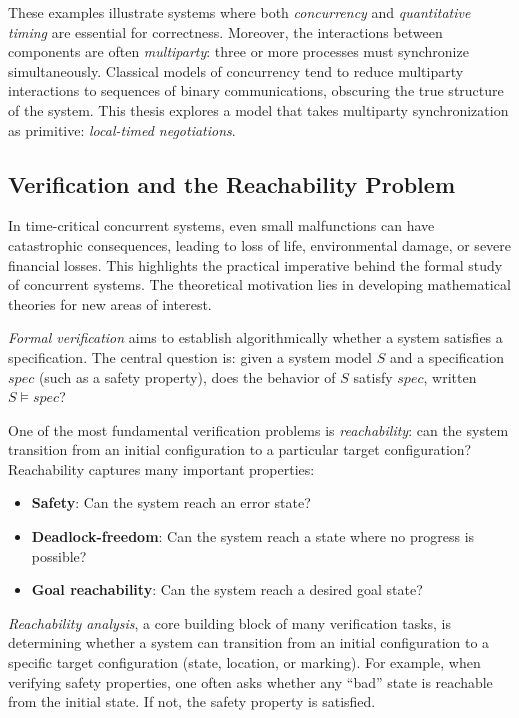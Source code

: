 These examples illustrate systems where both \emph{concurrency} and \emph{quantitative timing} are essential for correctness. Moreover, the interactions between components are often \emph{multiparty}: three or more processes must synchronize simultaneously. Classical models of concurrency tend to reduce multiparty interactions to sequences of binary communications, obscuring the true structure of the system. This thesis explores a model that takes multiparty synchronization as primitive: \emph{local-timed negotiations}.

\subsection{Verification and the Reachability Problem}

In time-critical concurrent systems, even small malfunctions can have catastrophic consequences, leading to loss of life, environmental damage, or severe financial losses. This highlights the practical imperative behind the formal study of concurrent systems. The theoretical motivation lies in developing mathematical theories for new areas of interest. 

\emph{Formal verification} aims to establish algorithmically whether a system satisfies a specification. The central question is: given a system model $S$ and a specification $\mathit{spec}$ (such as a safety property), does the behavior of $S$ satisfy $\mathit{spec}$, written $S \models \mathit{spec}$?

One of the most fundamental verification problems is \emph{reachability}: can the system transition from an initial configuration to a particular target configuration? Reachability captures many important properties:
\begin{itemize}
\item \textbf{Safety}: Can the system reach an error state?
\item \textbf{Deadlock-freedom}: Can the system reach a state where no progress is possible?
\item \textbf{Goal reachability}: Can the system reach a desired goal state?
\end{itemize}

\textit{Reachability analysis}, a core building block of many verification tasks, is determining whether a system can transition from an initial configuration to a specific target configuration (state, location, or marking). For example, when verifying safety properties, one often asks whether any ``bad'' state is reachable from the initial state. If not, the safety property is satisfied.

